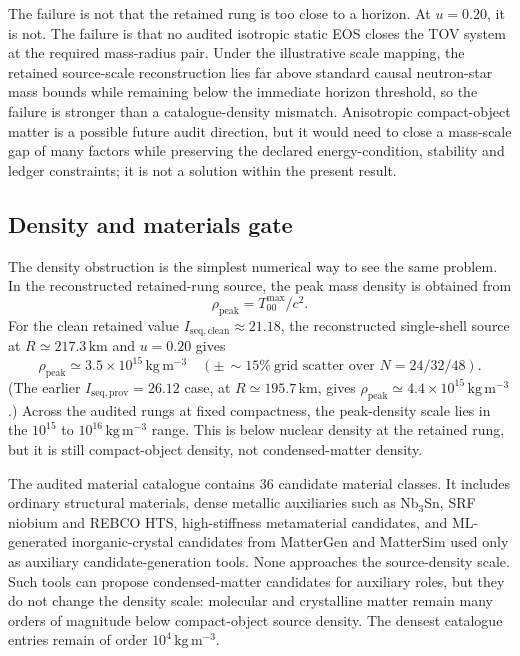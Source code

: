 \documentclass[11pt,a4paper]{article}
\begin{document}
The failure is not that the retained rung is too close to a horizon. At $u=0.20$, it is not. The failure is that no audited isotropic static EOS closes the TOV system at the required mass-radius pair. Under the illustrative scale mapping, the retained source-scale reconstruction lies far above standard causal neutron-star mass bounds while remaining below the immediate horizon threshold, so the failure is stronger than a catalogue-density mismatch. Anisotropic compact-object matter is a possible future audit direction, but it would need to close a mass-scale gap of many factors while preserving the declared energy-condition, stability and ledger constraints; it is not a solution within the present result.

\subsection{Density and materials gate}

The density obstruction is the simplest numerical way to see the same problem. In the reconstructed retained-rung source, the peak mass density is obtained from
\[
\rho_{\mathrm{peak}} = T_{00}^{\max}/c^{2}.
\]
For the clean retained value $I_{\mathrm{seq,clean}}\approx21.18$, the reconstructed single-shell source at $R\simeq217.3\,\mathrm{km}$ and $u=0.20$ gives
\[
\rho_{\mathrm{peak}} \simeq 3.5\times10^{15}\,\mathrm{kg\,m^{-3}}\quad(\pm\,{\sim}15\%\ \text{grid scatter over }N=24/32/48).
\]
(The earlier $I_{\mathrm{seq,prov}}=26.12$ case, at $R\simeq195.7\,\mathrm{km}$, gives $\rho_{\mathrm{peak}}\simeq4.4\times10^{15}\,\mathrm{kg\,m^{-3}}$.)
Across the audited rungs at fixed compactness, the peak-density scale lies in the $10^{15}$ to $10^{16}\,\mathrm{kg\,m^{-3}}$ range. This is below nuclear density at the retained rung, but it is still compact-object density, not condensed-matter density.

The audited material catalogue contains 36 candidate material classes. It includes ordinary structural materials, dense metallic auxiliaries such as Nb$_{3}$Sn, SRF niobium and REBCO HTS, high-stiffness metamaterial candidates, and ML-generated inorganic-crystal candidates from MatterGen and MatterSim used only as auxiliary candidate-generation tools. None approaches the source-density scale. Such tools can propose condensed-matter candidates for auxiliary roles, but they do not change the density scale: molecular and crystalline matter remain many orders of magnitude below compact-object source density. The densest catalogue entries remain of order $10^{4}\,\mathrm{kg\,m^{-3}}$. \cite{MatterGen2024,MatterSim2024}
\end{document}
